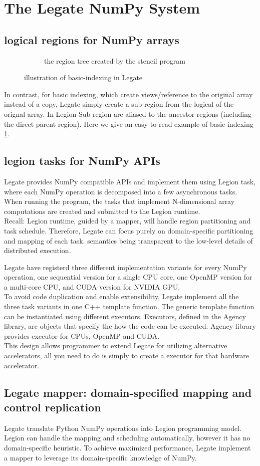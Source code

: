 \documentclass{article}
\newenvironment{newSec}[1]{
	\section{#1}
	\lhead{#1}
}{ \newpage }
\newenvironment{newSubsec}[1]{
	\subsection{#1}
}{}
\begin{document}
\begin{newSec}{The Legate NumPy System}
\begin{newSubsec}{logical regions for NumPy arrays}
\begin{figure}[htbp]
\begin{center}
\begin{subfigure}{0.4\textwidth}
					\caption{the region tree created by the stencil program}
				\end{subfigure}
			\end{center}
			\label{fig:basicindexing}
			\caption{illustration of basic-indexing in Legate}
		\end{figure}
	\end{newSubsec}
	In contrast, for basic indexing, which create views/reference to the original array instead of a copy,
	Legate simply create a sub-region from the logical of the orignal array.
	In Legion Sub-region are aliased to the ancestor regions (including the direct parent region).
	Here we give an easy-to-read example of basic indexing \ref{fig:basicindexing}.

	\begin{newSubsec}{legion tasks for NumPy APIs}
		Legate provides NumPy compatible APIs and implement them using Legion task, where each NumPy operation is decomposed into a few asynchronous tasks.
		When running the program, the tasks that implement N-dimensional array computations are created and submitted to the Legion runtime.\\
		Recall: Legion runtime, guided by a mapper, will handle region partitioning and task schedule.
		Therefore, Legate can focus purely on domain-specific partitioning and mapping of each task.
		semantics being transparent to the low-level details of distributed execution.\par

		Legate have registerd three different implementation variants for every NumPy operation,
		one sequential version for a single CPU core, one OpenMP version for a multi-core CPU, and CUDA version for NVIDIA GPU.\\
		To avoid code duplication and enable extensibility, Legate implement all the three task variants in one C++ template function.
		The generic template function can be instantiated using different executors.
		Executors, defined in the Agency library, are objects that specify the how the code can be executed. Agency library provides executor for CPUs, OpenMP and CUDA.\\
		This design allows programmer to extend Legate for utilizing alternative accelerators, all you need to do is simply to create a executor for that hardware accelerator.
	\end{newSubsec}

	\begin{newSubsec}{Legate mapper: domain-specified mapping and control replication}
		Legate translate Python NumPy operations into Legion programming model.
		Legion can handle the mapping and scheduling automatically, however it has no domain-specific heuristic.
		To achieve maximized performance, Legate implement a mapper to leverage its domain-specific knowledge of NumPy.\par


\end{newSubsec}
\end{newSec}
\end{document}
